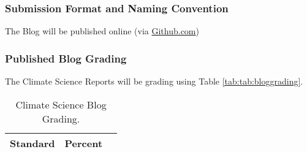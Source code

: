 \subsubsection{Submission Format and Naming Convention}

The Blog will be published online (via \url{Github.com}) 

\subsubsection{Published Blog Grading}

The Climate Science Reports will be grading using Table \ref{tab:tab:bloggrading}. 

\begin{table}[h]
\caption{Climate Science Blog Grading.}
\label{tab:bloggrading}
\begin{tabular}{lll}\hline
Standard      &   Percent   & \\ \hline\hline
\hline
\end{tabular}
\end{table}

